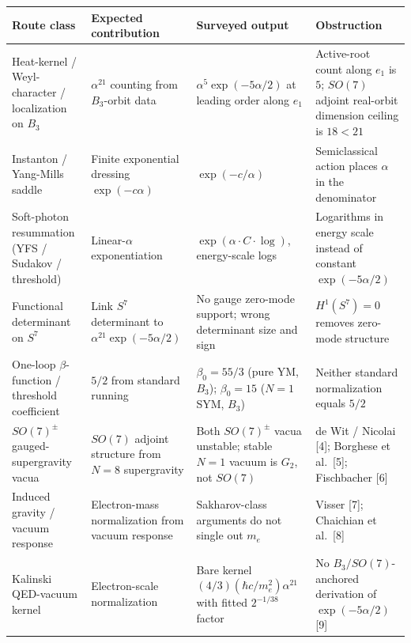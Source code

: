 \documentclass[
  11pt,
  letterpaper,
  twocolumn,
]{article}
\begin{document}
\begin{table}[!htb]
\centering\small
\begin{tabular}{@{}
  >{\raggedright\arraybackslash}p{}
  >{\raggedright\arraybackslash}p{}
  >{\raggedright\arraybackslash}p{}
  >{\raggedright\arraybackslash}p{}@{}}
\toprule
\begin{minipage}[b]{\linewidth}\raggedright
Route class
\end{minipage} & \begin{minipage}[b]{\linewidth}\raggedright
Expected contribution
\end{minipage} & \begin{minipage}[b]{\linewidth}\raggedright
Surveyed output
\end{minipage} & \begin{minipage}[b]{\linewidth}\raggedright
Obstruction
\end{minipage} \\
\midrule
Heat-kernel / Weyl-character / localization on \(B_3\) & \(\alpha^{21}\)
counting from \(B_3\)-orbit data & \(\alpha^5\exp(-5\alpha/2)\) at
leading order along \(e_1\) & Active-root count along \(e_1\) is \(5\);
\(SO(7)\) adjoint real-orbit dimension ceiling is \(18 < 21\) \\
Instanton / Yang-Mills saddle & Finite exponential dressing
\(\exp(-c\alpha)\) & \(\exp(-c/\alpha)\) & Semiclassical action places
\(\alpha\) in the denominator \\
Soft-photon resummation (YFS / Sudakov / threshold) & Linear-\(\alpha\)
exponentiation & \(\exp(\alpha\cdot C\cdot\log)\), energy-scale logs &
Logarithms in energy scale instead of constant \(\exp(-5\alpha/2)\) \\
Functional determinant on \(S^7\) & Link \(S^7\) determinant to
\(\alpha^{21}\exp(-5\alpha/2)\) & No gauge zero-mode support; wrong
determinant size and sign & \(H^1(S^7) = 0\) removes zero-mode
structure \\
One-loop \(\beta\)-function / threshold coefficient & \(5/2\) from
standard running & \(\beta_0 = 55/3\) (pure YM, \(B_3\));
\(\beta_0 = 15\) (\(N\!=\!1\) SYM, \(B_3\)) & Neither standard
normalization equals \(5/2\) \\
\(SO(7)^\pm\) gauged-supergravity vacua & \(SO(7)\) adjoint structure
from \(N\!=\!8\) supergravity & Both \(SO(7)^\pm\) vacua unstable;
stable \(N\!=\!1\) vacuum is \(G_2\), not \(SO(7)\) & de Wit / Nicolai
{[}4{]}; Borghese et al.~{[}5{]}; Fischbacher {[}6{]} \\
Induced gravity / vacuum response & Electron-mass normalization from
vacuum response & Sakharov-class arguments do not single out \(m_e\) &
Visser {[}7{]}; Chaichian et al.~{[}8{]} \\
Kalinski QED-vacuum kernel & Electron-scale normalization & Bare kernel
\((4/3)(\hbar c/m_e^2)\alpha^{21}\) with fitted \(2^{-1/38}\) factor &
No \(B_3/SO(7)\)-anchored derivation of \(\exp(-5\alpha/2)\) {[}9{]} \\
\bottomrule
\end{tabular}
\end{table}
\end{document}
